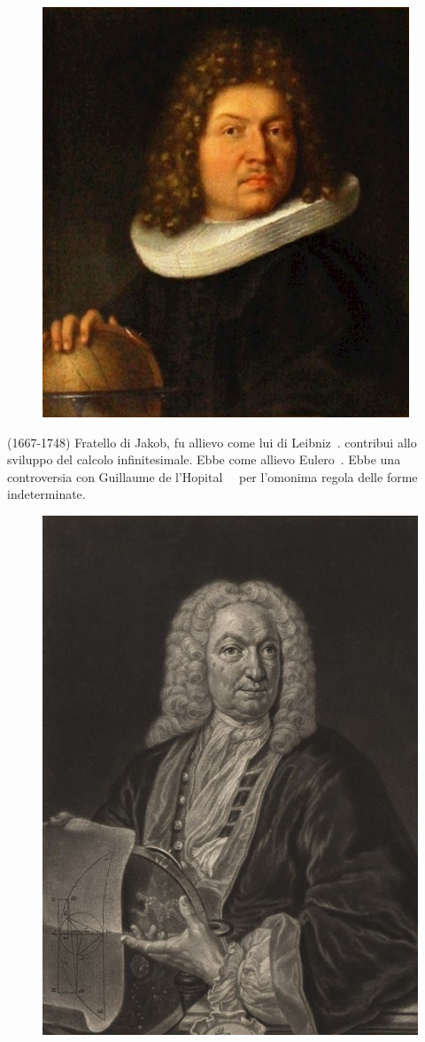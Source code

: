 \begin{figure}
\centering{}
\includegraphics[width=0.7\linewidth]{Figure/B/Jakob_Bernoulli}
		\label{fig:jakobbernoulli}
\end{figure}
\cite{Kline1972}(1667-1748) Fratello di Jakob, fu allievo come lui di Leibniz\pointsto~. contribui allo sviluppo del calcolo infinitesimale. Ebbe come allievo Eulero\pointsto~. Ebbe una controversia con Guillaume de l'Hopital  \pointsto~\ per l'omonima regola delle forme indeterminate.
\begin{figure}
	\centering
{}
	\label{fig:johannbernoulli}
	\includegraphics[width=0.7\linewidth]{Figure/B/Johann_Bernoulli}
\end{figure}
